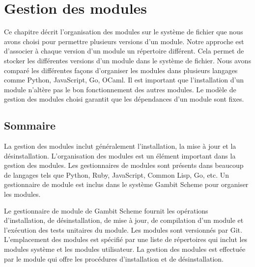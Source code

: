 
\chapter{Gestion des modules}
\label{ch:module_management}


Ce chapitre décrit l'organisation des modules sur le système de fichier que
nous avons choisi pour permettre plusieurs versions d'un module. Notre
approche est d'associer à chaque version d'un module un répertoire différent.
Cela permet de stocker les différentes versions d'un module dans le système de
fichier.  Nous avons comparé les différentes façons d'organiser les modules
dans plusieurs langages comme Python, JavaScript, Go, OCaml. Il est important
que l'installation d'un module n'altère pas le bon fonctionnement des autres
modules.  Le modèle de gestion des modules choisi garantit que les dépendances
d'un module sont fixes.


\section{Sommaire}
La gestion des modules inclut généralement l'installation, la mise à jour et
la désinstallation. L'organisation des modules est un élément important
dans la gestion des modules. Les gestionnaires de modules sont présents dans
beaucoup de langages tels que Python, Ruby, JavaScript, Common Lisp, Go, etc.
Un gestionnaire de module est inclus dans le système Gambit Scheme pour
organiser les modules.

Le gestionnaire de module de Gambit Scheme fournit les opérations
d'installation, de désinstallation, de mise à jour, de compilation
d'un module et l'exécution des tests unitaires du module. Les modules
sont versionnés par Git. L'emplacement des modules est spécifié par
une liste de répertoires qui inclut les modules système et les modules
utilisateur. La gestion des modules est effectuée par le module 
qui offre les procédures d'installation et de désinstallation.



